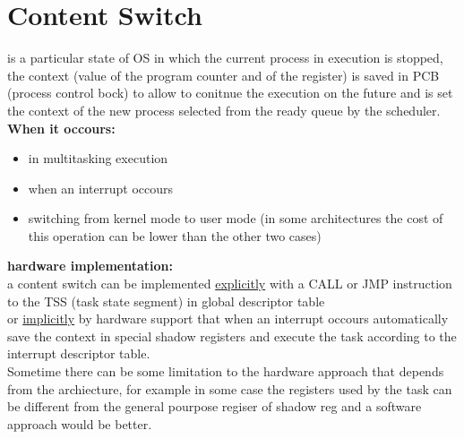\section{Content Switch}
is a particular state of OS in which the current process in execution is stopped, the context (value of the program counter and of the register) is saved in PCB (process control bock) to allow to conitnue the execution on the future and is set the context of the new process selected from the ready queue by the scheduler.\\
\textbf{When it occours:} \\
\begin{itemize}
		\item in multitasking execution
		\item when an interrupt occours
		\item switching from kernel mode to user mode (in some architectures the cost of this operation can be lower than the other two cases)
\end{itemize}
\textbf{hardware implementation:} \\
a content switch can be implemented \underline{explicitly} with a CALL or JMP instruction to the TSS (task state segment) in global descriptor table\\
or \underline{implicitly} by hardware support that when an interrupt occours automatically save the context in special shadow registers and execute the task according to the interrupt descriptor table.\\
Sometime there can be some limitation to the hardware approach that depends from the archiecture, for example in some case the registers used by the task can be different from the general pourpose regiser of shadow reg and a software approach would be better.








